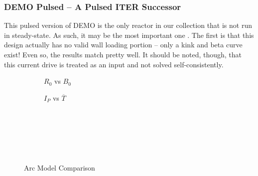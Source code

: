 
\subsubsection{DEMO Pulsed -- A Pulsed ITER Successor}

This pulsed version of DEMO is the only reactor in our collection that is not run in steady-state. As such, it may be the most important one . The first  is that this design actually has no valid wall loading portion -- only a kink and beta curve exist! Even so, the results match pretty well. It should be noted, though, that this current drive is treated as an input and not solved self-consistently.

\clearpage

\newpage

\begin{figure*}[h!]
    \centering
    \hfill 
    \begin{subfigure}[t]{0.45\textwidth}
        \centering
    \begin{adjustbox}{width=\textwidth}
      \Large
      
    \end{adjustbox}
        \caption{$R_0$ vs $B_0$}
    \end{subfigure}
    \hfill
    \begin{subfigure}[t]{0.45\textwidth}
        \centering
    \begin{adjustbox}{width=\textwidth}
      \Large
      
    \end{adjustbox}
        \caption{$I_P$ vs $\overline T$}
    \end{subfigure}
    \hfill \hfill ~\\ ~\\ ~\\
    \caption{Arc Model Comparison} ~\\
    \label{fig:arc_comparison}
\end{figure*}

